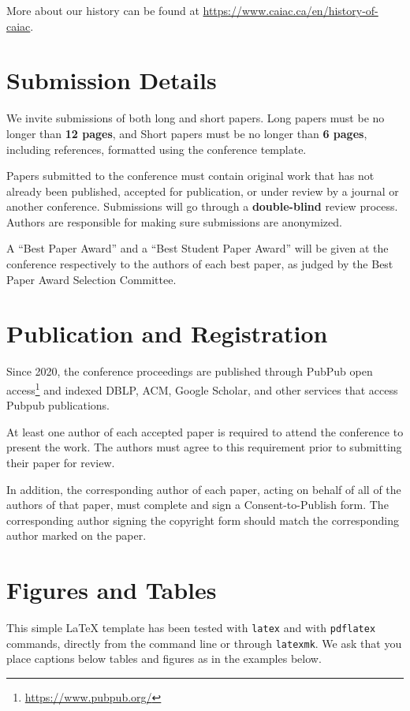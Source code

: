 \documentclass[10pt]{cai}
\begin{document}
More about our history can be found at \url{https://www.caiac.ca/en/history-of-caiac}. 

\section{Submission Details}
\label{submission}
We invite submissions of both long and short papers. Long papers must be no longer than \textbf{12 pages}, and Short papers must be no longer than \textbf{6 pages}, including references, formatted using the conference template. 

Papers submitted to the conference must contain original work that has not already been published, accepted for publication, or under review by a journal or another conference. Submissions will go through a \textbf{double-blind} review process. Authors are responsible for making sure submissions are anonymized.

A ``Best Paper Award'' and a ``Best Student Paper Award'' will be given at the conference respectively to the authors of each best paper, as judged by the Best Paper Award Selection Committee.

\section{Publication and Registration}
\label{pub}
Since 2020, the conference proceedings are published through PubPub open access\footnote{\url{https://www.pubpub.org/}} and indexed DBLP, ACM, Google Scholar, and other services that access Pubpub publications.

At least one author of each accepted paper is required to attend the conference to present the work. The authors must agree to this requirement prior to submitting their paper for review.

In addition, the corresponding author of each paper, acting on behalf of all of the authors of that paper, must complete and sign a Consent-to-Publish form. The corresponding author signing the copyright form should match the corresponding author marked on the paper.

\section{Figures and Tables}

This simple \LaTeX\xspace template has been tested with \texttt{latex} and with \texttt{pdflatex} commands, directly from the command line or through \texttt{latexmk}. We ask that you place captions below tables and figures as in the examples below.
\end{document}
